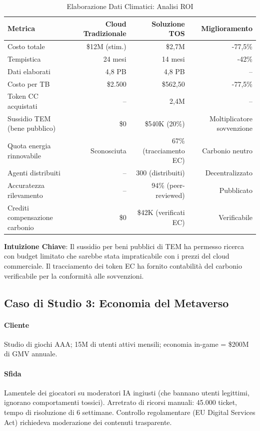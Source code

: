 \documentclass[11pt]{article}
\begin{document}
\begin{itemize}[noitemsep]
\begin{table}[H]
\centering
\caption{Elaborazione Dati Climatici: Analisi ROI}
\label{tab:climate-roi}
\begin{tabular}{@{}lrrr@{}}
\toprule
\textbf{Metrica} & \textbf{Cloud Tradizionale} & \textbf{Soluzione TOS} & \textbf{Miglioramento} \\ \midrule
Costo totale & \$12M (stim.) & \$2,7M & -77,5\% \\
Tempistica & 24 mesi & 14 mesi & -42\% \\
Dati elaborati & 4,8 PB & 4,8 PB & -- \\
Costo per TB & \$2.500 & \$562,50 & -77,5\% \\
Token CC acquistati & -- & 2,4M & -- \\
Sussidio TEM (bene pubblico) & \$0 & \$540K (20\%) & Moltiplicatore sovvenzione \\
Quota energia rinnovabile & Sconosciuta & 67\% (tracciamento EC) & Carbonio neutro \\
Agenti distribuiti & -- & 300 (distribuiti) & Decentralizzato \\
Accuratezza rilevamento & -- & 94\% (peer-reviewed) & Pubblicato \\
Crediti compensazione carbonio & \$0 & \$42K (verificati EC) & Verificabile \\
\bottomrule
\end{tabular}
\end{table}

\textbf{Intuizione Chiave}: Il sussidio per beni pubblici di TEM ha permesso ricerca con budget limitato che sarebbe stata impraticabile con i prezzi del cloud commerciale. Il tracciamento dei token EC ha fornito contabilità del carbonio verificabile per la conformità alle sovvenzioni.

\subsection{Caso di Studio 3: Economia del Metaverso}

\paragraph{Cliente} Studio di giochi AAA; 15M di utenti attivi mensili; economia in-game = \$200M di GMV annuale.

\paragraph{Sfida} Lamentele dei giocatori su moderatori IA ingiusti (che bannano utenti legittimi, ignorano comportamenti tossici). Arretrato di ricorsi manuali: 45.000 ticket, tempo di risoluzione di 6 settimane. Controllo regolamentare (EU Digital Services Act) richiedeva moderazione dei contenuti trasparente.


\end{itemize}
\end{document}
